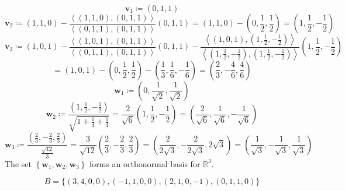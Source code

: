 \documentclass[12pt, letterpaper]{report}
\begin{document}
\begin{solution}
    \[
        \mathbf{v} _1\coloneqq (0,1,1)
    \]
    \[
        \mathbf{v} _2\coloneqq (1,1,0)-\frac{\left\langle (1,1,0),(0,1,1) \right\rangle }{\left\langle (0,1,1),(0,1,1) \right\rangle }(0,1,1)=(1,1,0)-\left( 0,\frac{1}{2},\frac{1}{2} \right) =\left( 1,\frac{1}{2},-\frac{1}{2} \right) 
    \]
    \[
        \mathbf{v} _3\coloneqq (1,0,1)-\frac{\left\langle (1,0,1),(0,1,1) \right\rangle }{\left\langle (0,1,1),(0,1,1) \right\rangle }(0,1,1)-\frac{\left\langle (1,0,1),\left( 1,\frac{1}{2},-\frac{1}{2} \right)  \right\rangle }{\left\langle \left( 1,\frac{1}{2},-\frac{1}{2} \right),\left( 1,\frac{1}{2},-\frac{1}{2} \right) \right\rangle }\left( 1,\frac{1}{2},-\frac{1}{2} \right)
    \]
    \[
        =(1,0,1)-\left( 0,\frac{1}{2},\frac{1}{2} \right)-\left( \frac{1}{3},\frac{1}{6},-\frac{1}{6} \right)=\left( \frac{2}{3},-\frac{4}{6},\frac{4}{6} \right)   
    \]
    \[
        \mathbf{w} _1\coloneqq \left( 0,\frac{1}{\sqrt{2} },\frac{1}{\sqrt{2} } \right) 
    \]
    \[
        \mathbf{w} _2\coloneqq \frac{\left( 1,\frac{1}{2},-\frac{1}{2} \right) }{\sqrt{1+\frac{1}{4}+\frac{1}{4}} }=\frac{2}{\sqrt{6} }\left( 1,\frac{1}{2},-\frac{1}{2} \right)=\left( \frac{2}{\sqrt{6}},\frac{1}{\sqrt{6} },-\frac{1}{\sqrt{6} } \right)  
    \]
    \[
        \mathbf{w} _3\coloneqq \frac{\left( \frac{2}{3},-\frac{2}{3},\frac{2}{3} \right) }{\frac{\sqrt{12} }{3}}=\frac{3}{\sqrt{12} }\left( \frac{2}{3},-\frac{2}{3},\frac{2}{3}\right) =\left( \frac{2}{2\sqrt{3} },-\frac{2}{2\sqrt{3} },2\sqrt{3}  \right)=\left( \frac{1}{\sqrt{3} },-\frac{1}{\sqrt{3} },\frac{1}{\sqrt{3} } \right)  
    \]
    The set \(\left\{ \mathbf{w} _1,\mathbf{w} _2,\mathbf{w} _3 \right\} \) forms an orthonormal basis for \(\mathbb{R} ^3\).
\end{solution}
\begin{exercise}
    \[
        B=\{ (3,4,0,0),(-1,1,0,0),(2,1,0,-1),(0,1,1,0) \} 
    \]
\end{exercise}
\end{document}

